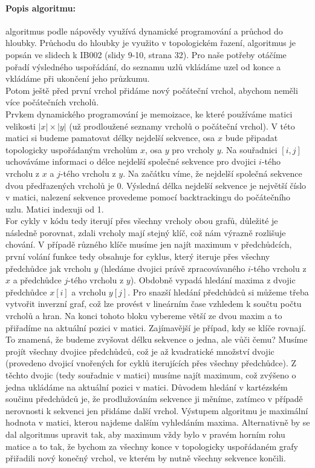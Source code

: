 \documentclass[12pt]{iv003}
\begin{document}
\paragraph{Popis algoritmu:} algoritmus podle nápovědy využívá dynamické programování a průchod do hloubky. Průchodu do hloubky je využito v topologickém řazení, algoritmus je popsán ve slidech k IB002 (slidy 9-10, strana 32). Pro naše potřeby otáčíme pořadí výsledného uspořádání, do seznamu uzlů vkládáme uzel od konce a vkládáme při ukončení jeho průzkumu.\\
Potom ještě před první vrchol přidáme nový počáteční vrchol, abychom neměli více počátečních vrcholů.\\
Prvkem dynamického programování je memoizace, ke které používáme matici velikosti $|x| \times |y|$ (už prodloužené seznamy vrcholů o počáteční vrchol). V této matici si budeme pamatovat délky nejdelší sekvence, osa $x$ bude připadat topologicky uspořádaným vrcholům $x$, osa $y$ pro vrcholy $y$. Na souřadnici $[i,j]$ uchováváme informaci o délce nejdelší společné sekvence pro dvojici $i$-tého vrcholu z $x$ a $j$-tého vrcholu z $y$. Na začátku víme, že nejdelší společná sekvence dvou předřazených vrcholů je 0. Výsledná délka nejdelší sekvence je největší číslo v matici, nalezení sekvence provedeme pomocí backtrackingu do počátečního uzlu. Matici indexuji od 1.\\
For cykly v kódu tedy iterují přes všechny vrcholy obou grafů, důležité je následně porovnat, zdali vrcholy mají stejný klíč, což nám výrazně rozlišuje chování. V případě různého klíče musíme jen najít maximum v předchůdcích, první volání funkce \ffmax tedy obsahuje for cyklus, který iteruje přes všechny předchůdce jak vrcholu $y$ (hledáme dvojici právě zpracovávaného $i$-tého vrcholu z $x$ a předchůdce $j$-tého vrcholu z $y$). Obdobně vypadá hledání maxima z dvojic předchůdce $x[i]$ a vrcholu $y[j]$. Pro snazší hledání předchůdců si můžeme třeba vytvořit inverzní graf, což lze provést v lineárním čase vzhledem k součtu počtu vrcholů a hran. Na konci tohoto bloku vybereme větší ze dvou maxim a to přiřadíme na aktuální pozici v matici.
Zajímavější je případ, kdy se klíče rovnají. To znamená, že budeme zvyšovat délku sekvence o jedna, ale vůči čemu? Musíme projít všechny dvojice předchůdců, což je až kvadratické množství dvojic (provedeno dvojicí vnořených for cyklů iterujících přes všechny předchůdce). Z těchto dvojic (tedy souřadnic v matici) musíme najít maximum, což zvýšeno o jedna ukládáme na aktuální pozici v matici. Důvodem hledání v kartézském součinu předchůdců je, že prodlužováním sekvence ji měníme, zatímco v případě nerovnosti k sekvenci jen přidáme další vrchol.
Výstupem algoritmu je maximální hodnota v matici, kterou najdeme dalším vyhledáním maxima. Alternativně by se dal algoritmus upravit tak, aby maximum vždy bylo v pravém horním rohu matice a to tak, že bychom za všechny konce v topologicky uspořádaném grafy přiřadili nový konečný vrchol, ve kterém by nutně všechny sekvence končili.
\end{document}
